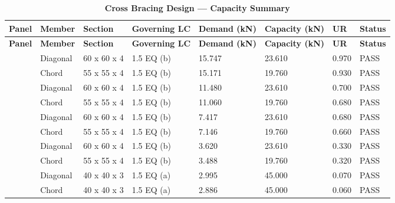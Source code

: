 \documentclass[12pt,a4paper]{report}
\numberwithin{table}{chapter}
\numberwithin{figure}{chapter}
\newcommand{\ReportTableRowGap}{6pt}
\begin{document}
\vspace{1em}
\begin{longtable}{|C{2.0cm}|L{1.8cm}|C{2.2cm}|C{3.0cm}|C{1.8cm}|C{1.8cm}|C{1.2cm}|C{1.8cm}|}
\caption{\textbf{Cross Bracing Design --- Capacity Summary}}\\
\hline
\textbf{Panel} & \textbf{Member} & \textbf{Section} & \textbf{Governing LC} & \textbf{Demand (kN)} & \textbf{Capacity (kN)} & \textbf{UR} & \textbf{Status} \\[\ReportTableRowGap]
\hline
\endfirsthead
\hline
\textbf{Panel} & \textbf{Member} & \textbf{Section} & \textbf{Governing LC} & \textbf{Demand (kN)} & \textbf{Capacity (kN)} & \textbf{UR} & \textbf{Status} \\[\ReportTableRowGap]
\hline
\endhead

 & Diagonal & 60 x 60 x 4 & 1.5 EQ (b) & 15.747 & 23.610 & 0.970 & \textcolor{reportBlack}{PASS} \\[\ReportTableRowGap]
 & Chord & 55 x 55 x 4 & 1.5 EQ (b) & 15.171 & 19.760 & 0.930 & \textcolor{reportBlack}{PASS} \\[\ReportTableRowGap]
\hline
{} & Diagonal & 60 x 60 x 4 & 1.5 EQ (b) & 11.480 & 23.610 & 0.700 & \textcolor{reportBlack}{PASS} \\[\ReportTableRowGap]
 & Chord & 55 x 55 x 4 & 1.5 EQ (b) & 11.060 & 19.760 & 0.680 & \textcolor{reportBlack}{PASS} \\[\ReportTableRowGap]
\hline
{} & Diagonal & 60 x 60 x 4 & 1.5 EQ (b) & 7.417 & 23.610 & 0.680 & \textcolor{reportBlack}{PASS} \\[\ReportTableRowGap]
 & Chord & 55 x 55 x 4 & 1.5 EQ (b) & 7.146 & 19.760 & 0.660 & \textcolor{reportBlack}{PASS} \\[\ReportTableRowGap]
\hline
{} & Diagonal & 60 x 60 x 4 & 1.5 EQ (b) & 3.620 & 23.610 & 0.330 & \textcolor{reportBlack}{PASS} \\[\ReportTableRowGap]
 & Chord & 55 x 55 x 4 & 1.5 EQ (b) & 3.488 & 19.760 & 0.320 & \textcolor{reportBlack}{PASS} \\[\ReportTableRowGap]
\hline
{} & Diagonal & 40 x 40 x 3 & 1.5 EQ (a) & 2.995 & 45.000 & 0.070 & \textcolor{reportBlack}{PASS} \\[\ReportTableRowGap]
 & Chord & 40 x 40 x 3 & 1.5 EQ (a) & 2.886 & 45.000 & 0.060 & \textcolor{reportBlack}{PASS} \\[\ReportTableRowGap]

\end{longtable}
\end{document}

